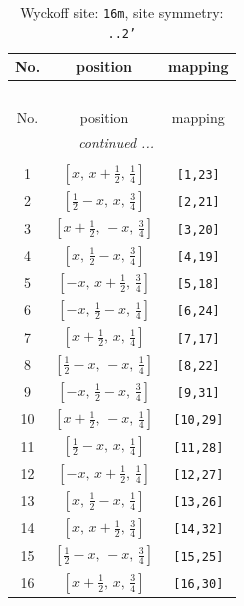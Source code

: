 \documentclass[fleqn,8pt]{jsarticle}
\begin{document}
\renewcommand{\arraystretch}{1.2}
\begin{longtable}{ccc}
\caption{Wyckoff site: {\tt 16m}, site symmetry: {\tt ..2'}}
 \\
 \hline \hline
No. & position & mapping \\ \hline \endfirsthead

\multicolumn{2}{l}{\tablename\ \thetable{}} \\
 \hline \hline
No. & position & mapping \\ \hline \endhead

 \hline \hline
\multicolumn{2}{r}{\footnotesize\it continued ...} \\ \endfoot

 \hline \hline
\multicolumn{2}{r}{} \\ \endlastfoot

1 & $\left[ x,\, x + \frac{1}{2},\, \frac{1}{4} \right]$ & {\tt [1,23]} \\ \hline
2 & $\left[ \frac{1}{2} - x,\, x,\, \frac{3}{4} \right]$ & {\tt [2,21]} \\ \hline
3 & $\left[ x + \frac{1}{2},\, - x,\, \frac{3}{4} \right]$ & {\tt [3,20]} \\ \hline
4 & $\left[ x,\, \frac{1}{2} - x,\, \frac{3}{4} \right]$ & {\tt [4,19]} \\ \hline
5 & $\left[ - x,\, x + \frac{1}{2},\, \frac{3}{4} \right]$ & {\tt [5,18]} \\ \hline
6 & $\left[ - x,\, \frac{1}{2} - x,\, \frac{1}{4} \right]$ & {\tt [6,24]} \\ \hline
7 & $\left[ x + \frac{1}{2},\, x,\, \frac{1}{4} \right]$ & {\tt [7,17]} \\ \hline
8 & $\left[ \frac{1}{2} - x,\, - x,\, \frac{1}{4} \right]$ & {\tt [8,22]} \\ \hline
9 & $\left[ - x,\, \frac{1}{2} - x,\, \frac{3}{4} \right]$ & {\tt [9,31]} \\ \hline
10 & $\left[ x + \frac{1}{2},\, - x,\, \frac{1}{4} \right]$ & {\tt [10,29]} \\ \hline
11 & $\left[ \frac{1}{2} - x,\, x,\, \frac{1}{4} \right]$ & {\tt [11,28]} \\ \hline
12 & $\left[ - x,\, x + \frac{1}{2},\, \frac{1}{4} \right]$ & {\tt [12,27]} \\ \hline
13 & $\left[ x,\, \frac{1}{2} - x,\, \frac{1}{4} \right]$ & {\tt [13,26]} \\ \hline
14 & $\left[ x,\, x + \frac{1}{2},\, \frac{3}{4} \right]$ & {\tt [14,32]} \\ \hline
15 & $\left[ \frac{1}{2} - x,\, - x,\, \frac{3}{4} \right]$ & {\tt [15,25]} \\ \hline
16 & $\left[ x + \frac{1}{2},\, x,\, \frac{3}{4} \right]$ & {\tt [16,30]} \\
\end{longtable}
\end{document}
